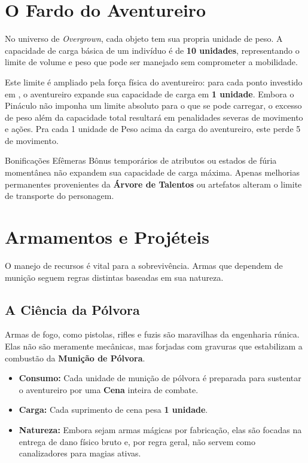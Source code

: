 
\section*{O Fardo do Aventureiro}

No universo de \textit{Overgrown}, cada objeto tem sua propria unidade de peso. A capacidade de carga básica de um indivíduo é de \textbf{10 unidades}, representando o limite de volume e peso que pode ser manejado sem comprometer a mobilidade.

Este limite é ampliado pela força física do aventureiro: para cada ponto investido em , o aventureiro expande sua capacidade de carga em \textbf{1 unidade}. Embora o Pináculo não imponha um limite absoluto para o que se pode carregar, o excesso de peso além da capacidade total resultará em penalidades severas de movimento e ações. Pra cada 1 unidade de Peso acima da carga do aventureiro, este perde 5 de movimento.

\begin{rpgboxtips}{Bonificações Efêmeras}
Bônus temporários de atributos ou estados de fúria momentânea não expandem sua capacidade de carga máxima. Apenas melhorias permanentes provenientes da \textbf{Árvore de Talentos} ou artefatos  alteram o limite de transporte do personagem.
\end{rpgboxtips}

\section*{Armamentos e Projéteis}

O manejo de recursos é vital para a sobrevivência. Armas que dependem de munição seguem regras distintas baseadas em sua natureza.

\subsection*{A Ciência da Pólvora}
Armas de fogo, como pistolas, rifles e fuzis são maravilhas da engenharia rúnica. Elas não são meramente mecânicas, mas forjadas com gravuras que estabilizam a combustão da \textbf{Munição de Pólvora}. 
\begin{itemize}
    \item \textbf{Consumo:} Cada unidade de munição de pólvora é preparada para sustentar o aventureiro por uma \textbf{Cena} inteira de combate.
    \item \textbf{Carga:} Cada suprimento de cena pesa \textbf{1 unidade}.
    \item \textbf{Natureza:} Embora sejam armas mágicas por fabricação, elas são focadas na entrega de dano físico bruto e, por regra geral, não servem como canalizadores para magias ativas.
\end{itemize}

